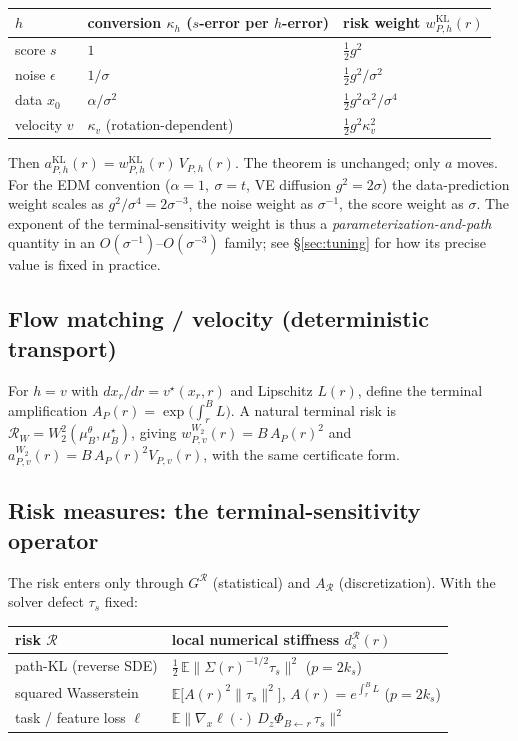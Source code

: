 \documentclass[11pt]{article}
\newcommand{\R}{\mathcal R}
\newcommand{\E}{\mathbb E}
\newcommand{\norm}[1]{\lVert #1 \rVert}
\begin{document}
\begin{center}
\small
\begin{tabular}{lll}
\toprule
$h$ & conversion $\kappa_h$ ($s$-error per $h$-error) & risk weight $w^{\mathrm{KL}}_{P,h}(r)$ \\
\midrule
score $s$ & $1$ & $\tfrac12 g^2$ \\
noise $\epsilon$ & $1/\sigma$ & $\tfrac12 g^2/\sigma^2$ \\
data $x_0$ & $\alpha/\sigma^2$ & $\tfrac12 g^2\alpha^2/\sigma^4$ \\
velocity $v$ & $\kappa_v$ (rotation-dependent) & $\tfrac12 g^2\kappa_v^2$ \\
\bottomrule
\end{tabular}
\end{center}

\noindent Then $a_{P,h}^{\mathrm{KL}}(r)=w^{\mathrm{KL}}_{P,h}(r)\,V_{P,h}(r)$.
The theorem is unchanged; only $a$ moves. For the EDM convention
($\alpha=1,\ \sigma=t$, VE diffusion $g^2=2\sigma$) the data-prediction
weight scales as $g^2/\sigma^4=2\sigma^{-3}$, the noise weight as
$\sigma^{-1}$, the score weight as $\sigma$. The exponent of the
terminal-sensitivity weight is thus a \emph{parameterization-and-path}
quantity in an $O(\sigma^{-1})$--$O(\sigma^{-3})$ family; see
\S\ref{sec:tuning} for how its precise value is fixed in practice.

\subsection{Flow matching / velocity (deterministic transport)}
\label{sec:flow}
For $h=v$ with $dx_r/dr=v^\star(x_r,r)$ and Lipschitz $L(r)$, define the
terminal amplification $A_P(r)=\exp\!\big(\int_r^B L\big)$. A natural
terminal risk is $\R_{W}=W_2^2(\mu_B^\theta,\mu_B^\star)$, giving
$w^{W_2}_{P,v}(r)=B\,A_P(r)^2$ and
$a^{W_2}_{P,v}(r)=B\,A_P(r)^2 V_{P,v}(r)$, with the same certificate form.

\subsection{Risk measures: the terminal-sensitivity operator}
\label{sec:risks}

The risk enters only through $G^\R$ (statistical) and $A_\R$
(discretization). With the solver defect $\tau_s$ fixed:

\begin{center}
\small
\begin{tabular}{ll}
\toprule
risk $\R$ & local numerical stiffness $d^\R_{s}(r)$ \\
\midrule
path-KL (reverse SDE) & $\tfrac12\,\E\big\|\Sigma(r)^{-1/2}\tau_s\big\|^2$ \quad ($p=2k_s$) \\
squared Wasserstein & $\E\big[A(r)^2\norm{\tau_s}^2\big]$, $A(r)=e^{\int_r^B L}$ \quad ($p=2k_s$)\\
task / feature loss $\ell$ & $\E\big\|\nabla_x\ell(\cdot)\,D_z\Phi_{B\leftarrow r}\,\tau_s\big\|^2$ \\
\bottomrule
\end{tabular}
\end{center}
\end{document}
